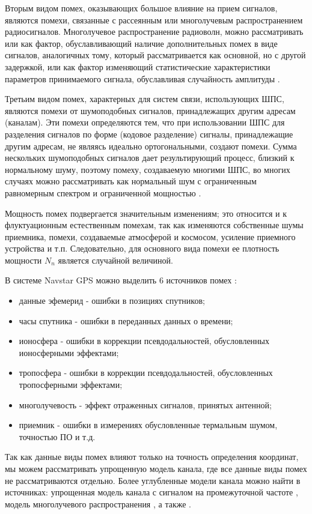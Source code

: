 Вторым видом помех, оказывающих
большое влияние на прием сигналов, являются помехи, связанные с рассеянным или многолучевым распространением
радиосигналов. Многолучевое распространение радиоволн, можно рассматривать или как фактор, обуславливающий
наличие дополнительных помех в виде сигналов, аналогичных тому, который рассматривается как основной, но с другой
задержкой, или как фактор изменяющий статистические характеристики параметров принимаемого сигнала,
обуславливая случайность амплитуды \cite{pestryakov-book}.

Третьим видом помех, характерных для систем связи, использующих ШПС, являются помехи от шумоподобных сигналов,
принадлежащих другим адресам (каналам). Эти помехи определяются тем, что при использовании ШПС для разделения
сигналов по форме (кодовое разделение) сигналы, принадлежащие другим адресам, не являясь идеально ортогональными,
создают помехи. Сумма нескольких шумоподобных сигналов дает результирующий процесс, близкий к нормальному шуму,
поэтому помеху, создаваемую многими ШПС, во многих случаях можно рассматривать как нормальный шум с ограниченным
равномерным спектром и ограниченной мощностью \cite{pestryakov-book}.

Мощность помех подвергается значительным изменениям; это относится и к флуктуационным естественным помехам, так как
изменяются собственные шумы приемника, помехи, создаваемые атмосферой и космосом, усиление приемного устройства
и т.п. Следовательно, для основного вида помехи ее плотность мощности ${N_n}$ является случайной величиной.

В системе Navstar GPS можно выделить 6 источников помех \cite{parkinson_1996}:
\begin{itemize}
	\item {данные эфемерид - ошибки в позициях спутников;}
	\item {часы спутника - ошибки в переданных данных о времени;}
	\item {ионосфера - ошибки в коррекции псевдодальностей, обусловленных ионосферными эффектами;}
	\item {тропосфера - ошибки в коррекции псевдодальностей, обусловленных тропосферными эффектами;}
	\item {многолучевость - эффект отраженных сигналов, принятых антенной;}
	\item {приемник - ошибки в измерениях обусловленные термальным шумом, точностью ПО и т.д.}
\end{itemize}

Так как данные виды помех влияют только на точность определения координат, мы можем рассматривать упрощенную модель
канала, где все данные виды помех не рассматриваются отдельно. Более углубленные модели канала можно найти в
источниках: упрощенная модель канала с сигналом на промежуточной частоте \cite{lei_dong_phd}, модель многолучевого
распространения \cite{hannah_phd}, а также \cite{burns_model, corbell_model, crs_model, brown_model}.

